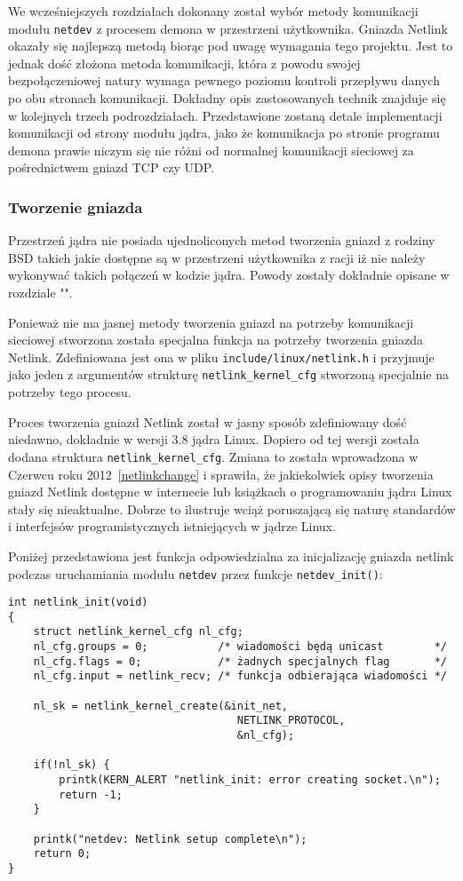 \documentclass[10pt]{scrartcl}
\begin{document}
We wcześniejszych rozdziałach dokonany został wybór metody komunikacji modułu \texttt{netdev} z procesem demona w przestrzeni użytkownika.  Gniazda Netlink okazały się najlepszą metodą biorąc pod uwagę wymagania tego projektu. Jest to jednak dość złożona metoda komunikacji, która z powodu swojej bezpołączeniowej natury wymaga pewnego poziomu kontroli przepływu danych po obu stronach komunikacji. Dokładny opis zastosowanych technik znajduje się w kolejnych trzech podrozdziałach.  Przedstawione zostaną detale implementacji komunikacji od strony modułu jądra, jako że komunikacja po stronie programu demona prawie niczym się nie różni od normalnej komunikacji sieciowej za pośrednictwem gniazd TCP czy UDP.

\subsubsection{Tworzenie gniazda}
\label{sockcreate}

Przestrzeń jądra nie posiada ujednoliconych metod tworzenia gniazd z rodziny BSD takich jakie dostępne są w przestrzeni użytkownika z racji iż nie należy wykonywać takich połączeń w kodzie jądra. Powody zostały dokładnie opisane w rozdziale "".

Ponieważ nie ma jasnej metody tworzenia gniazd na potrzeby komunikacji sieciowej stworzona została specjalna funkcja na potrzeby tworzenia gniazda Netlink. Zdefiniowana jest ona w pliku \texttt{include/linux/netlink.h} i przyjmuje jako jeden z argumentów strukturę \texttt{netlink\_kernel\_cfg} stworzoną specjalnie na potrzeby tego procesu.

Proces tworzenia gniazd Netlink został w jasny sposób zdefiniowany dość niedawno, dokładnie w wersji 3.8 jądra Linux. Dopiero od tej wersji została dodana struktura \texttt{netlink\_kernel\_cfg}. Zmiana to została wprowadzona w Czerwcu roku 2012~\ref{netlinkchange} i sprawiła, że jakiekolwiek opisy tworzenia gniazd Netlink dostępne w internecie lub książkach o programowaniu jądra Linux stały się nieaktualne. Dobrze to ilustruje wciąż poruszającą się naturę standardów i interfejsów programistycznych istniejących w jądrze Linux.

Poniżej przedstawiona jest funkcja odpowiedzialna za inicjalizację gniazda netlink podczas uruchamiania modułu \texttt{netdev} przez funkcje \texttt{netdev\_init()}:

\begin{verbatim}
int netlink_init(void)
{
    struct netlink_kernel_cfg nl_cfg;
    nl_cfg.groups = 0;           /* wiadomości będą unicast        */
    nl_cfg.flags = 0;            /* żadnych specjalnych flag       */
    nl_cfg.input = netlink_recv; /* funkcja odbierająca wiadomości */

    nl_sk = netlink_kernel_create(&init_net,
                                    NETLINK_PROTOCOL,
                                    &nl_cfg);

    if(!nl_sk) {
        printk(KERN_ALERT "netlink_init: error creating socket.\n");
        return -1;
    }

    printk("netdev: Netlink setup complete\n");
    return 0;
}
\end{verbatim}
\end{document}

